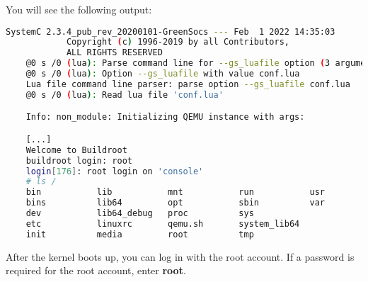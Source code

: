 You will see the following output:

\small
\begin{lstlisting}[language=bash]
            SystemC 2.3.4_pub_rev_20200101-GreenSocs --- Feb  1 2022 14:35:03
            Copyright (c) 1996-2019 by all Contributors,
            ALL RIGHTS RESERVED
    @0 s /0 (lua): Parse command line for --gs_luafile option (3 arguments)
    @0 s /0 (lua): Option --gs_luafile with value conf.lua
    Lua file command line parser: parse option --gs_luafile conf.lua
    @0 s /0 (lua): Read lua file 'conf.lua'

    Info: non_module: Initializing QEMU instance with args:

    [...]
    Welcome to Buildroot
    buildroot login: root
    login[176]: root login on 'console'
    # ls /
    bin           lib           mnt           run           usr
    bins          lib64         opt           sbin          var
    dev           lib64_debug   proc          sys
    etc           linuxrc       qemu.sh       system_lib64
    init          media         root          tmp
\end{lstlisting}
\normalsize

After the kernel boots up, you can log in with the root account. If a password is required for the root account, enter \textbf{root}.

